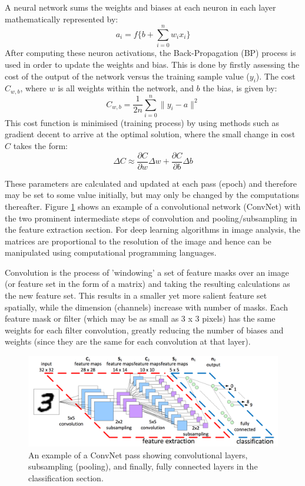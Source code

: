 \documentclass[fleqn,twoside,12pt]{report}
\begin{document}
A neural network sums the weights and biases at each neuron in each layer mathematically represented by: 
\begin{equation}
a_i = f\bigg\{b + \sum_{i=0}^{n} w_i x_i \bigg\}	
\end{equation}
After computing these neuron activations, the Back-Propagation (BP) process is used in order to update the weights and bias. This is done by firstly assessing the cost of the output of the network versus the training sample value ($y_i$). The cost $C_{w,b}$, where $w$ is all weights within the network, and $b$ the bias, is given by:
\begin{equation}
C_{w,b} = \frac{1}{2n} \sum_{i=0}^{n} \|y_i - a\|^2	
\end{equation}
This cost function is minimised (training process) by using methods such as gradient decent to arrive at the optimal solution, where the small change in cost $C$ takes the form:
\begin{equation}
\Delta C \approx \frac{\partial C}{\partial w} \Delta w + \frac{\partial C}{\partial b} \Delta b	
\end{equation}

These parameters are calculated and updated at each pass (epoch) and therefore may be set to some value initially, but may only be changed by the computations thereafter. Figure \ref{fig:conv3} shows an example of a convolutional network (ConvNet) with the two prominent intermediate steps of convolution and pooling/subsampling in the feature extraction section. For deep learning algorithms in image analysis, the matrices are proportional to the resolution of the image and hence can be manipulated using computational programming languages. 

Convolution is the process of 'windowing' a set of feature masks over an image (or feature set in the form of a matrix) and taking the resulting calculations as the new feature set. This results in a smaller yet more salient feature set spatially, while the dimension (channels) increase with number of masks. Each feature mask or filter (which may be as small as 3 x 3 pixels) has the same weights for each filter convolution, greatly reducing the number of biases and weights (since they are the same for each convolution at that layer). 

\begin{figure}[h]
	\centering
	\includegraphics[width=\textwidth]{conv3.png}
	\caption{An example of a ConvNet pass showing convolutional layers, subsampling (pooling), and finally, fully connected layers in the classification section.}
	\label{fig:conv3}
\end{figure}
\end{document}

